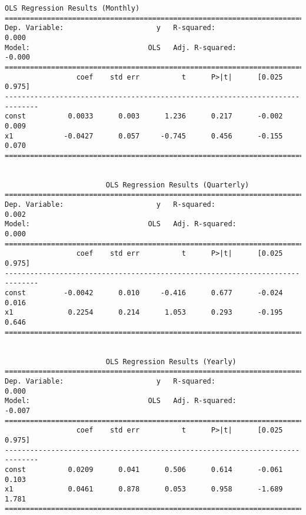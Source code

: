 \documentclass[11pt]{article}
\begin{document}
    \begin{Verbatim}[commandchars=\\\{\}]
                        OLS Regression Results (Monthly)                         
==============================================================================
Dep. Variable:                      y   R-squared:                       0.000
Model:                            OLS   Adj. R-squared:                 -0.000
==============================================================================
                 coef    std err          t      P>|t|      [0.025      0.975]
------------------------------------------------------------------------------
const          0.0033      0.003      1.236      0.217      -0.002       0.009
x1            -0.0427      0.057     -0.745      0.456      -0.155       0.070
==============================================================================


                        OLS Regression Results (Quarterly)                         
==============================================================================
Dep. Variable:                      y   R-squared:                       0.002
Model:                            OLS   Adj. R-squared:                  0.000
==============================================================================
                 coef    std err          t      P>|t|      [0.025      0.975]
------------------------------------------------------------------------------
const         -0.0042      0.010     -0.416      0.677      -0.024       0.016
x1             0.2254      0.214      1.053      0.293      -0.195       0.646
==============================================================================


                        OLS Regression Results (Yearly)                            
==============================================================================
Dep. Variable:                      y   R-squared:                       0.000
Model:                            OLS   Adj. R-squared:                 -0.007
==============================================================================
                 coef    std err          t      P>|t|      [0.025      0.975]
------------------------------------------------------------------------------
const          0.0209      0.041      0.506      0.614      -0.061       0.103
x1             0.0461      0.878      0.053      0.958      -1.689       1.781
==============================================================================


    \end{Verbatim}
\end{document}
